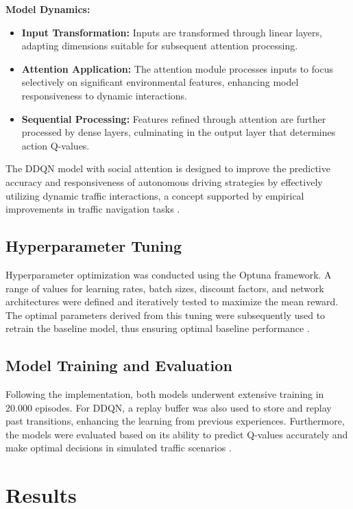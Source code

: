 \documentclass{article}
\begin{document}
\textbf{Model Dynamics:}
\begin{itemize}
    \item \textbf{Input Transformation:} Inputs are transformed through linear layers, adapting dimensions suitable for subsequent attention processing.
    \item \textbf{Attention Application:} The attention module processes inputs to focus selectively on significant environmental features, enhancing model responsiveness to dynamic interactions.
    \item \textbf{Sequential Processing:} Features refined through attention are further processed by dense layers, culminating in the output layer that determines action Q-values.
\end{itemize}

The DDQN model with social attention is designed to improve the predictive accuracy and responsiveness of autonomous driving strategies by effectively utilizing dynamic traffic interactions, a concept supported by empirical improvements in traffic navigation tasks \citep{8500630, 9664628}.

\subsection{Hyperparameter Tuning}
Hyperparameter optimization was conducted using the Optuna framework. A range of values for learning rates, batch sizes, discount factors, and network architectures were defined and iteratively tested to maximize the mean reward. The optimal parameters derived from this tuning were subsequently used to retrain the baseline model, thus ensuring optimal baseline performance \citep{optuna_2019}.

\subsection{Model Training and Evaluation}
Following the implementation, both models underwent extensive training in 20.000 episodes. For DDQN, a replay buffer was also used to store and replay past transitions, enhancing the learning from previous experiences. Furthermore, the models were evaluated based on its ability to predict Q-values accurately and make optimal decisions in simulated traffic scenarios \citep{9664628}.

\section{Results}
\end{document}
